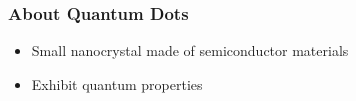 \documentclass{beamer}
\begin{document}
\begin{frame}
    \frametitle{About Quantum Dots}
    \begin{itemize}
        \item Small nanocrystal made of semiconductor materials
        \pause
        \item Exhibit quantum properties
    \end{itemize}
\end{frame}
\end{document}
